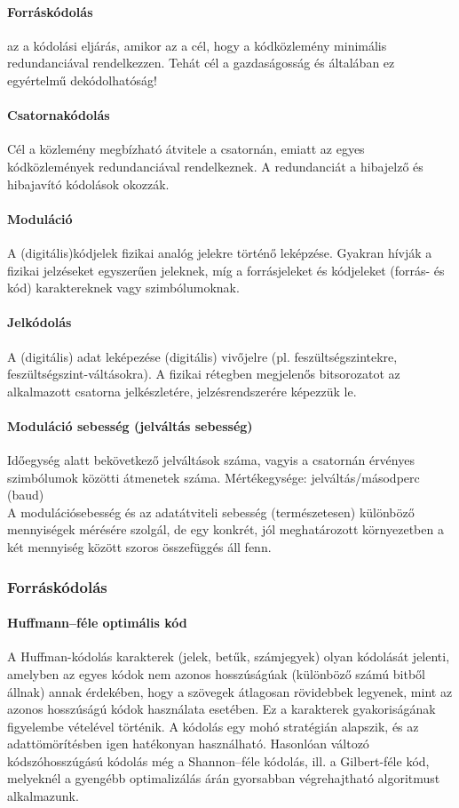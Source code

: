 \paragraph{Forráskódolás} az a kódolási eljárás, amikor az a cél, hogy a kódközlemény minimális redundanciával rendelkezzen. Tehát cél a gazdaságosság és általában ez egyértelmű dekódolhatóság!

\paragraph{Csatornakódolás} Cél a közlemény megbízható átvitele a csatornán, emiatt az egyes kódközlemények redundanciával rendelkeznek. A redundanciát a hibajelző és hibajavító kódolások okozzák.

\paragraph{Moduláció} A (digitális)kódjelek fizikai analóg jelekre történő leképzése. Gyakran hívják a fizikai jelzéseket egyszerűen jeleknek, míg a forrásjeleket és kódjeleket (forrás- és kód) karaktereknek vagy szimbólumoknak.


\paragraph{Jelkódolás} A (digitális) adat leképezése (digitális) vivőjelre (pl. feszültségszintekre, feszültségszint-váltásokra). A fizikai rétegben megjelenős bitsorozatot az alkalmazott csatorna jelkészletére, jelzésrendszerére képezzük le.

\paragraph{Moduláció sebesség (jelváltás sebesség)} Időegység alatt bekövetkező jelváltások száma, vagyis a csatornán érvényes szimbólumok közötti átmenetek száma. Mértékegysége: jelváltás/másodperc (baud)\\
A modulációsebesség és az adatátviteli sebesség (természetesen) különböző mennyiségek mérésére szolgál, de egy konkrét, jól meghatározott környezetben a két mennyiség között szoros összefüggés áll fenn.

\subsubsection{Forráskódolás}
\paragraph{Huffmann--féle optimális kód}
A Huffman-kódolás karakterek (jelek, betűk, számjegyek) olyan kódolását jelenti, amelyben az egyes kódok nem azonos hosszúságúak (különböző számú bitből állnak) annak érdekében, hogy a szövegek átlagosan rövidebbek legyenek, mint az azonos hosszúságú kódok használata esetében. Ez a karakterek gyakoriságának figyelembe vételével történik. A kódolás egy mohó stratégián alapszik, és az adattömörítésben igen hatékonyan használható. Hasonlóan változó kódszóhosszúgású kódolás még a Shannon--féle kódolás, ill. a Gilbert-féle kód, melyeknél a gyengébb optimalizálás árán gyorsabban végrehajtható algoritmust alkalmazunk.

